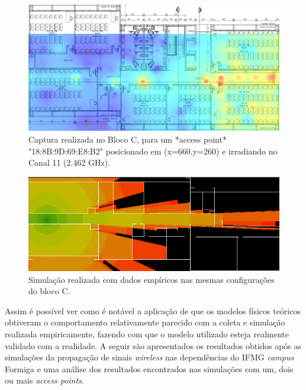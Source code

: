 \documentclass[
	12pt,				%
	twoside,			%
	a4paper,			%
	english,			%
	french,				%
	spanish,			%
	brazil				%
	]{abntex2}
\begin{document}
\begin{figure}[ht]
    \caption{\label{captura} Captura realizada no Bloco C, para um *access point* "18:8B:9D:69:E8:B2" posicionado em (x=660,y=260) e irradiando no Canal 11 (2.462 GHz).}
    \begin{center}
        \includegraphics[scale=0.5]{imagens/captura.jpg}
    \end{center}
\end{figure}
\begin{figure}[ht]
    \caption{\label{simulacao_vinicius} Simulação realizada com dados empíricos nas mesmas configurações do bloco C. }
    \begin{center}
        \includegraphics[scale=0.7]{imagens/simulacao_vinicius.png}
    \end{center}
\end{figure}

Assim é possível ver como é notável a aplicação de que os modelos
físicos teóricos obtiveram o comportamento relativamente parecido com a
coleta e simulação realizada empiricamente, fazendo com que o modelo
utilizado esteja realmente validado com a realidade. A seguir são
apresentados os resultados obtidos após as simulações da propagação de
sinais \emph{wireless} nas dependências do IFMG \emph{campus} Formiga e
uma análise dos resultados encontrados nas simulações com um, dois ou
mais \emph{access points}.
\end{document}
